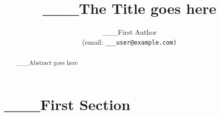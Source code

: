 \documentclass[a4paper,12pt]{report}
\title{___The Title goes here}
\author{
	___First Author\\
	(email: \tt{___user@example.com}) \\
}
\begin{document}
\maketitle

\begin{abstract}
___Abstract goes here
\end{abstract}

\tableofcontents
\newpage
\listoffigures
\newpage

\section{___First Section}




\end{document}
